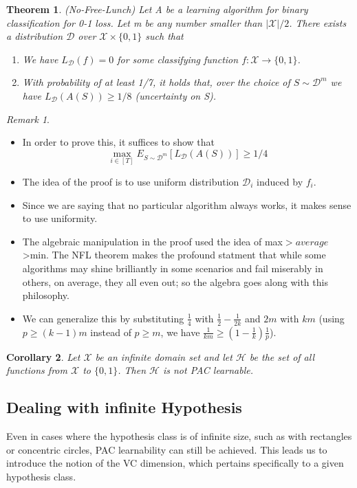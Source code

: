 \documentclass[11pt,reqno]{amsart}
\newtheorem{theorem}{Theorem}
\newtheorem{corollary}[theorem]{Corollary}
\theoremstyle{remark}
\newtheorem{remark}[example]{Remark}
\begin{document}
\begin{theorem}
(No-Free-Lunch) Let A be a learning algorithm for binary classification for 0-1 loss. Let m be any number smaller than $\lvert\mathcal{X}\vert/2$. There exists 
a distribution $\mathcal{D}$ over $\mathcal{X}\times\{0,1\}$ such that 
\begin{enumerate}
\item We have $L_\mathcal{D}(f)=0$ for some classifying function $f:\mathcal{X}\to\{0,1\}$.
\item With probability of at least 1/7, it holds that, over the
 choice of $S\sim \mathcal{D}^m$ we have $L_{\mathcal{D}}(A(S))\geq 1/8$ (uncertainty on S).
\end{enumerate}
\end{theorem}
\begin{remark}
\begin{itemize}
\item In order to prove this, it suffices to show that 
\[
\max_{i\in[T]} E_{S\sim\mathcal{D}^m}[L_\mathcal{D}(A(S))]\geq 1/4
\]
\item The idea of the proof is to use uniform distribution $\mathcal{D}_i$ induced by $f_i$. 
\item Since we are saying that no particular algorithm always works, it makes sense to use uniformity.
\item The algebraic manipulation in the proof used the idea of max$>average$>min. The NFL theorem makes the profound
statment that while some algorithms may shine brilliantly in some scenarios and fail miserably in others, on average, they all even out; so the 
algebra goes along with this philosophy.
\item We can generalize this by substituting $\frac 14$ with $\frac 12-\frac 1{2k}$ and $2m$ with $km$ (using $p\geq (k-1)m$ instead of $p\geq m$, we have $\frac 1{km}\geq (1-\frac 1k)\frac 1p$).
\end{itemize}
\end{remark}
\begin{corollary}
Let $\mathcal{X}$ be an infinite domain set and let $\mathcal{H}$ be the set of all functions from $\mathcal{X}$ to $\{0,1\}$. Then $\mathcal{H}$ is not PAC learnable.
\end{corollary}
\subsection*{Dealing with infinite Hypothesis}
Even in cases where the hypothesis class is of infinite size, such as with rectangles or concentric circles, PAC learnability can still be achieved. This leads 
us to introduce the notion of the VC dimension, which pertains specifically to a given hypothesis class.
\end{document}
